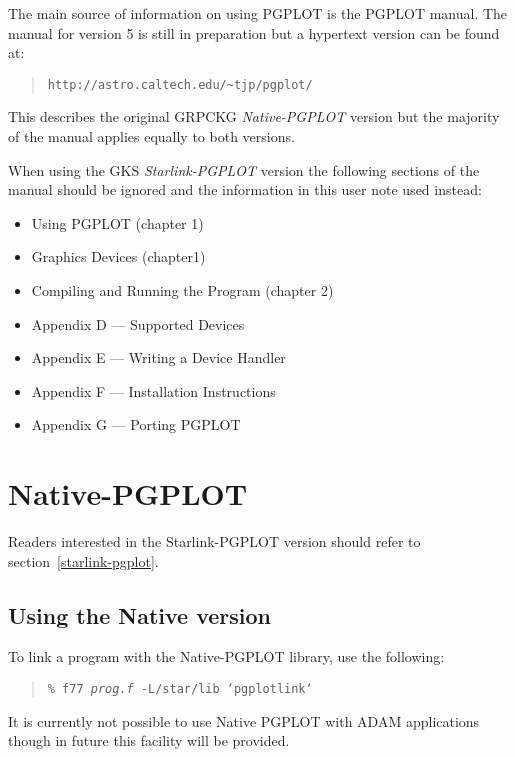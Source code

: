 \documentclass[twoside,11pt]{article}
\newcommand{\htmladdnormallink}[2]{#1}
\newcommand{\htmlref}[2]{#1}
\newcommand{\latexhtml}[2]{#1}
\newcommand{\xlabel}[1]{}
\renewcommand{\_}{\texttt{\symbol{95}}}
\begin{document}
The main source of information on using PGPLOT is the PGPLOT manual.
The manual for version 5 is still in preparation but a hypertext version
can be found at:
\begin{quote}
\texttt{\htmladdnormallink{http://astro.caltech.edu/\~{}tjp/pgplot/}{http://astro.caltech.edu/\~{}tjp/pgplot/}}
\end{quote}

This describes the original GRPCKG \emph{Native-PGPLOT} version but the
majority of the manual applies equally to both versions.

When using the GKS \emph{Starlink-PGPLOT} version the following
sections of the manual should be ignored and the information in this
user note used instead:

\begin{itemize}
\item Using PGPLOT (chapter 1)
\item Graphics Devices (chapter1)
\item Compiling and Running the Program (chapter 2)
\item Appendix D --- Supported Devices
\item Appendix E --- Writing a Device Handler
\item Appendix F --- Installation Instructions
\item Appendix G --- Porting PGPLOT
\end{itemize}

\section{\xlabel{native-pgplot}Native-PGPLOT}
\label{native-pgplot}

Readers interested in the Starlink-PGPLOT version should refer to
section~\latexhtml{\ref{starlink-pgplot}} %
{\htmlref{\emph{Starlink-PGPLOT}}{starlink-pgplot}}.

\subsection{\xlabel{using_the_native_version}Using the Native version}
\label{using_the_native_version}

To link a program with the Native-PGPLOT library, use the following:

\begin{quote}
\texttt{\% f77 \emph{prog.f} -L/star/lib `pgplot\_link`}
\end{quote}

It is currently not possible to use Native PGPLOT with ADAM applications
though in future this facility will be provided.
\end{document}
